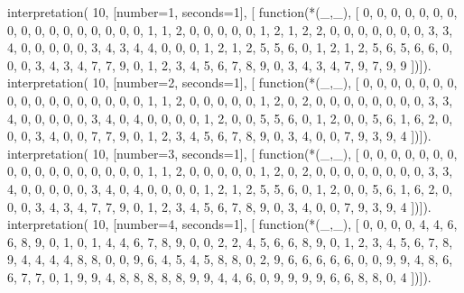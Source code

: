 interpretation( 10, [number=1, seconds=1], [
  function(*(_,_), [
     0, 0, 0, 0, 0, 0, 0, 0, 0, 0,
     0, 0, 0, 0, 0, 0, 0, 1, 1, 2,
     0, 0, 0, 0, 0, 1, 2, 1, 2, 2,
     0, 0, 0, 0, 0, 0, 0, 3, 3, 4,
     0, 0, 0, 0, 0, 3, 4, 3, 4, 4,
     0, 0, 0, 1, 2, 1, 2, 5, 5, 6,
     0, 1, 2, 1, 2, 5, 6, 5, 6, 6,
     0, 0, 0, 3, 4, 3, 4, 7, 7, 9,
     0, 1, 2, 3, 4, 5, 6, 7, 8, 9,
     0, 3, 4, 3, 4, 7, 9, 7, 9, 9 ])]).
interpretation( 10, [number=2, seconds=1], [
  function(*(_,_), [
     0, 0, 0, 0, 0, 0, 0, 0, 0, 0,
     0, 0, 0, 0, 0, 0, 0, 1, 1, 2,
     0, 0, 0, 0, 0, 1, 2, 0, 2, 0,
     0, 0, 0, 0, 0, 0, 0, 3, 3, 4,
     0, 0, 0, 0, 0, 3, 4, 0, 4, 0,
     0, 0, 0, 1, 2, 0, 0, 5, 5, 6,
     0, 1, 2, 0, 0, 5, 6, 1, 6, 2,
     0, 0, 0, 3, 4, 0, 0, 7, 7, 9,
     0, 1, 2, 3, 4, 5, 6, 7, 8, 9,
     0, 3, 4, 0, 0, 7, 9, 3, 9, 4 ])]).
interpretation( 10, [number=3, seconds=1], [
  function(*(_,_), [
     0, 0, 0, 0, 0, 0, 0, 0, 0, 0,
     0, 0, 0, 0, 0, 0, 0, 1, 1, 2,
     0, 0, 0, 0, 0, 1, 2, 0, 2, 0,
     0, 0, 0, 0, 0, 0, 0, 3, 3, 4,
     0, 0, 0, 0, 0, 3, 4, 0, 4, 0,
     0, 0, 0, 1, 2, 1, 2, 5, 5, 6,
     0, 1, 2, 0, 0, 5, 6, 1, 6, 2,
     0, 0, 0, 3, 4, 3, 4, 7, 7, 9,
     0, 1, 2, 3, 4, 5, 6, 7, 8, 9,
     0, 3, 4, 0, 0, 7, 9, 3, 9, 4 ])]).
interpretation( 10, [number=4, seconds=1], [
  function(*(_,_), [
     0, 0, 0, 0, 4, 4, 6, 6, 8, 9,
     0, 1, 0, 1, 4, 4, 6, 7, 8, 9,
     0, 0, 2, 2, 4, 5, 6, 6, 8, 9,
     0, 1, 2, 3, 4, 5, 6, 7, 8, 9,
     4, 4, 4, 4, 8, 8, 0, 0, 9, 6,
     4, 5, 4, 5, 8, 8, 0, 2, 9, 6,
     6, 6, 6, 6, 0, 0, 9, 9, 4, 8,
     6, 6, 7, 7, 0, 1, 9, 9, 4, 8,
     8, 8, 8, 8, 9, 9, 4, 4, 6, 0,
     9, 9, 9, 9, 6, 6, 8, 8, 0, 4 ])]).
